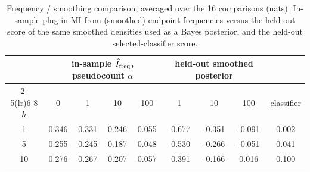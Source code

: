 \begin{table}[htbp]
\centering
\small
\caption{Frequency / smoothing comparison, averaged over the 16 comparisons (nats). In-sample plug-in MI from (smoothed) endpoint frequencies versus the held-out score of the same smoothed densities used as a Bayes posterior, and the held-out selected-classifier score.}\label{tab:frequency}
\begin{tabular}{c cccc ccc c}
\toprule
& \multicolumn{4}{c}{in-sample $\widehat I_{\rm freq}$, pseudocount $\alpha$} & \multicolumn{3}{c}{held-out smoothed posterior} & \\ \cmidrule(lr){2-5}\cmidrule(lr){6-8}
$h$ & 0 & 1 & 10 & 100 & 1 & 10 & 100 & classifier \\
\midrule
1 & 0.346 & 0.331 & 0.246 & 0.055 & -0.677 & -0.351 & -0.091 & 0.002 \\
5 & 0.255 & 0.245 & 0.187 & 0.048 & -0.530 & -0.266 & -0.051 & 0.041 \\
10 & 0.276 & 0.267 & 0.207 & 0.057 & -0.391 & -0.166 & 0.016 & 0.100 \\
\bottomrule
\end{tabular}
\end{table}